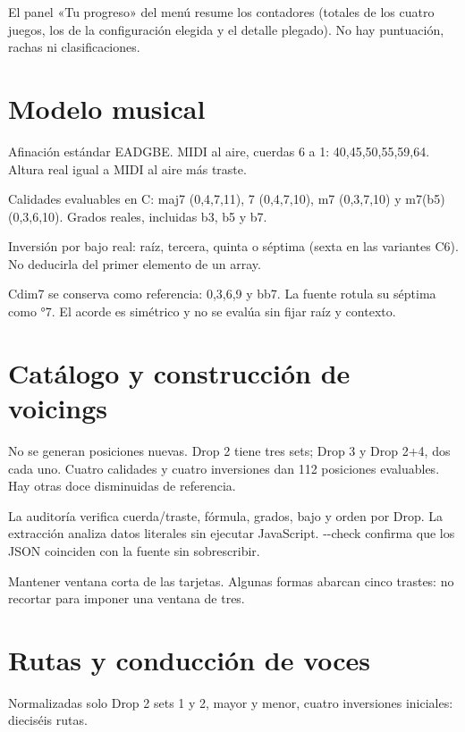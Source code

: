 \documentclass[a4paper,11pt]{article}
\begin{document}
El panel «Tu progreso» del menú resume los contadores (totales de los
cuatro juegos, los de la configuración elegida y el detalle plegado). No
hay puntuación, rachas ni clasificaciones.

\Needspace{4cm}
\section{Modelo musical}\label{modelo-musical}

Afinación estándar EADGBE. MIDI al aire, cuerdas 6 a 1:
40,45,50,55,59,64. Altura real igual a MIDI al aire más traste.

Calidades evaluables en C: maj7 (0,4,7,11), 7 (0,4,7,10), m7 (0,3,7,10)
y m7(b5) (0,3,6,10). Grados reales, incluidas b3, b5 y b7.

Inversión por bajo real: raíz, tercera, quinta o séptima (sexta en las
variantes C6). No deducirla del primer elemento de un array.

Cdim7 se conserva como referencia: 0,3,6,9 y bb7. La fuente rotula su
séptima como °7. El acorde es simétrico y no se evalúa sin fijar raíz y
contexto.

\Needspace{4cm}
\section{Catálogo y construcción de
voicings}\label{catuxe1logo-y-construcciuxf3n-de-voicings}

No se generan posiciones nuevas. Drop 2 tiene tres sets; Drop 3 y Drop
2+4, dos cada uno. Cuatro calidades y cuatro inversiones dan 112
posiciones evaluables. Hay otras doce disminuidas de referencia.

La auditoría verifica cuerda/traste, fórmula, grados, bajo y orden por
Drop. La extracción analiza datos literales sin ejecutar JavaScript.
-\/-check confirma que los JSON coinciden con la fuente sin
sobrescribir.

Mantener ventana corta de las tarjetas. Algunas formas abarcan cinco
trastes: no recortar para imponer una ventana de tres.

\Needspace{4cm}
\section{Rutas y conducción de
voces}\label{rutas-y-conducciuxf3n-de-voces}

Normalizadas solo Drop 2 sets 1 y 2, mayor y menor, cuatro inversiones
iniciales: dieciséis rutas.
\end{document}
